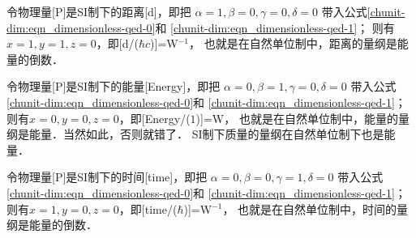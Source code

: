 令物理量[\si{P}]是SI制下的距离[\si{d}]，即把
$\alpha=1,\beta=0,\gamma=0,\delta=0$
带入公式\eqref{chunit-dim:eqn_dimensionless-qed-0}和
\eqref{chunit-dim:eqn_dimensionless-qed-1}；
则有$x=1,y=1,z=0$，即[\si{d}/($\hbar c$)]=\si{W}$^{-1}$，
也就是在自然单位制中，距离的量纲是能量的倒数．


令物理量[\si{P}]是SI制下的能量[\si{Energy}]，即把
$\alpha=0,\beta=1,\gamma=0,\delta=0$
带入公式\eqref{chunit-dim:eqn_dimensionless-qed-0}和
\eqref{chunit-dim:eqn_dimensionless-qed-1}；
则有$x=0,y=0,z=0$，即[\si{Energy}/($1$)]=\si{W}，
也就是在自然单位制中，能量的量纲是能量．当然如此，否则就错了．
SI制下质量的量纲在自然单位制下也是能量．

令物理量[\si{P}]是SI制下的时间[\si{time}]，即把
$\alpha=0,\beta=0,\gamma=1,\delta=0$
带入公式\eqref{chunit-dim:eqn_dimensionless-qed-0}和
\eqref{chunit-dim:eqn_dimensionless-qed-1}；
则有$x=1,y=0,z=0$，即[\si{time}/($\hbar$)]=\si{W}$^{-1}$，
也就是在自然单位制中，时间的量纲是能量的倒数．





